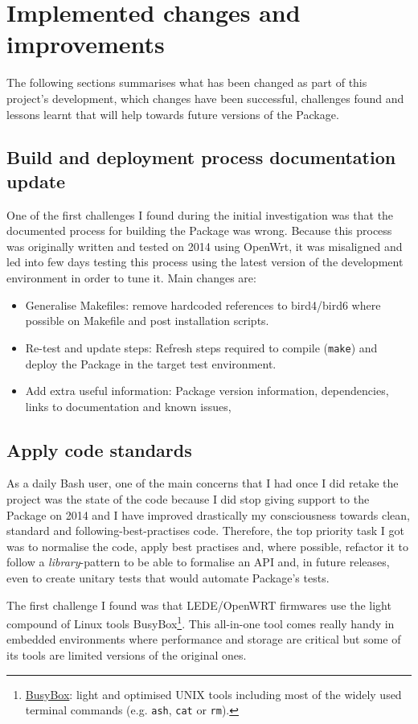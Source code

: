 \section{Implemented changes and improvements}
The following sections summarises what has been changed as part of this project's development, which changes have been successful, challenges found and lessons learnt that will help towards future versions of the Package.

\subsection{Build and deployment process documentation update}
One of the first challenges I found during the initial investigation was that the documented process for building the Package was wrong. Because this process was originally written and tested on 2014 using OpenWrt, it was misaligned and  led into few days testing this process using the latest version of the development environment in order to tune it. Main changes are:

\begin{itemize}
    \item Generalise Makefiles: remove hardcoded references to bird4/bird6 where possible on Makefile and post installation scripts.
    \item Re-test and update steps: Refresh steps required to compile (\texttt{make}) and deploy the Package in the target test environment.
    \item Add extra useful information: Package version information, dependencies, links to documentation and known issues,  \end{itemize}

\subsection{Apply code standards}
As a daily Bash user, one of the main concerns that I had once I did retake the project was the state of the code because I did stop giving support to the Package on 2014 and I have improved drastically my consciousness towards clean, standard and following-best-practises code. Therefore, the top priority task I got was to normalise the code, apply best practises and, where possible, refactor it to follow a \textit{library}-pattern to be able to formalise an API and, in future releases, even to create unitary tests that would automate Package's tests.

The first challenge I found was that LEDE/OpenWRT firmwares use the light compound of Linux tools BusyBox\footnote{\href{https://busybox.net/downloads/BusyBox.html}{BusyBox}: light and optimised UNIX tools including most of the widely used terminal commands (e.g. \texttt{ash}, \texttt{cat} or \texttt{rm}).}. This all-in-one tool comes really handy in embedded environments where performance and storage are critical but some of its tools are limited versions of the original ones.

